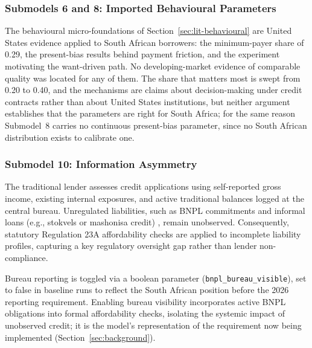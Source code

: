 \subsubsection*{Submodels 6 and 8: Imported Behavioural Parameters}
\label{sec:lim-transfer}

The behavioural micro-foundations of Section~\ref{sec:lit-behavioural} are United States evidence applied to South African borrowers: the minimum-payer share of 0.29, the present-bias results behind payment friction, and the experiment motivating the want-driven path.
No developing-market evidence of comparable quality was located for any of them.
The share that matters most is swept from 0.20 to 0.40, and the mechanisms are claims about decision-making under credit contracts rather than about United States institutions, but neither argument establishes that the parameters are right for South Africa; for the same reason Submodel~8 carries no continuous present-bias parameter, since no South African distribution exists to calibrate one.

\subsubsection*{Submodel 10: Information Asymmetry}
\label{sec:asymmetry}

The traditional lender assesses credit applications using self-reported gross income, existing internal exposures, and active traditional balances logged at the central bureau.
Unregulated liabilities, such as \ac{BNPL} commitments \cite{nortonrose_bnpl_sa, transunion_cps_sa_2025} and informal loans (e.g., stokvels or mashonisa credit) \cite{finscope2019}, remain unobserved. Consequently, statutory Regulation 23A affordability checks are applied to incomplete liability profiles, capturing a key regulatory oversight gap rather than lender non-compliance.

Bureau reporting is toggled via a boolean parameter (\texttt{bnpl\_bureau\_visible}), set to false in baseline runs to reflect the South African position before the 2026 reporting requirement.
Enabling bureau visibility incorporates active \ac{BNPL} obligations into formal affordability checks, isolating the systemic impact of unobserved credit; it is the model's representation of the requirement now being implemented (Section~\ref{sec:background}).

